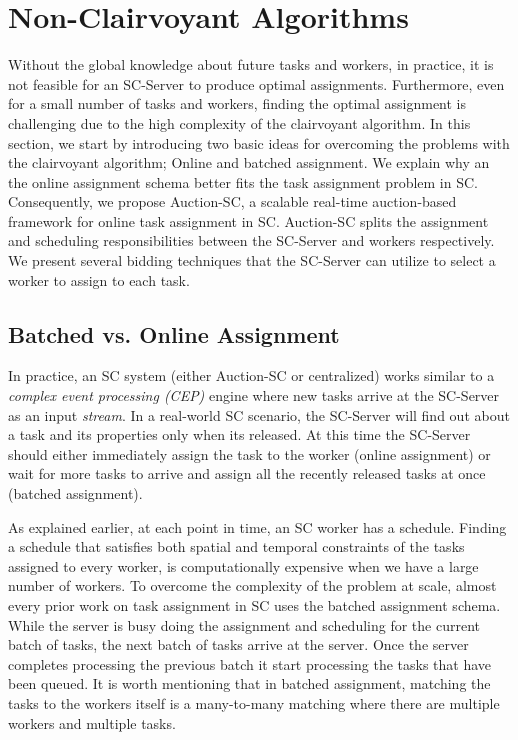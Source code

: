 \section{Non-Clairvoyant Algorithms}
\label{sec:onlinealgo}

Without the global knowledge about future tasks and workers, in practice, it is not feasible for an SC-Server to produce optimal assignments. Furthermore, even for a small number of tasks and workers, finding the optimal assignment is challenging due to the high complexity of the clairvoyant algorithm. In this section, we start by introducing two basic ideas for overcoming the problems with the clairvoyant algorithm; Online and batched assignment. We explain why an the online assignment schema better fits the task assignment problem in SC. Consequently, we propose Auction-SC, a scalable real-time auction-based framework for online task assignment in SC. Auction-SC splits the assignment and scheduling responsibilities between the SC-Server and workers respectively.  We present several bidding techniques that the SC-Server can utilize to select a worker to assign to each task.

\subsection{Batched vs. Online Assignment}
In practice, an SC system (either Auction-SC or centralized) works similar to a \emph{complex event processing (CEP)} engine \cite{Luckham01} where new tasks arrive at the SC-Server as an input \textit{stream}. In a real-world SC scenario, the SC-Server will find out about a task and its properties only when its released. At this time the SC-Server should either immediately assign the task to the worker (online assignment) or wait for more tasks to arrive and assign all the recently released tasks at once (batched assignment). 

As explained earlier, at each point in time, an SC worker has a schedule. Finding a schedule that satisfies both spatial and temporal constraints of the tasks assigned to every worker, is computationally expensive when we have a large number of workers. To overcome the complexity of the problem at scale, almost every prior work on task assignment in SC uses the batched assignment schema. While the server is busy doing the assignment and scheduling for the current batch of tasks, the next batch of tasks arrive at the server. Once the server completes processing the previous batch it start processing the tasks that have been queued. It is worth mentioning that in batched assignment, matching the tasks to the workers itself is a many-to-many matching where there are multiple workers and multiple tasks.

